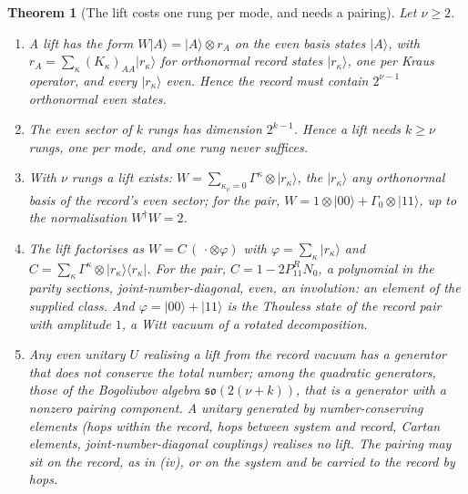 \documentclass[11pt]{article}
\newtheorem{theorem}{Theorem}[section]
\theoremstyle{definition}
\theoremstyle{plain}
\providecommand{\G}{}\renewcommand{\G}{\Gamma}
\providecommand{\bra}{}\renewcommand{\bra}[1]{\langle #1|}
\providecommand{\ket}{}\renewcommand{\ket}[1]{|#1\rangle}
\begin{document}
\begin{theorem}[The lift costs one rung per mode, and needs a pairing]\label{c:descent-lift.lift-costs-one-rung-per-mode}
Let $\nu \geq 2$.
\begin{enumerate}
\item[(i)] A lift has the form $W\ket{A} = \ket{A} \otimes r_{A}$ on the even basis states $\ket{A}$, with $r_{A} = \sum_{\kappa}(K_{\kappa})_{AA}\ket{r_{\kappa}}$ for orthonormal record states $\ket{r_{\kappa}}$, one per Kraus operator, and every $\ket{r_{\kappa}}$ even. Hence the record must contain $2^{\nu-1}$ orthonormal even states.
\item[(ii)] The even sector of $k$ rungs has dimension $2^{k-1}$. Hence a lift needs $k \geq \nu$ rungs, one per mode, and one rung never suffices.
\item[(iii)] With $\nu$ rungs a lift exists: $W = \sum_{\kappa_{\nu} = 0}\G^{\kappa} \otimes \ket{r_{\kappa}}$, the $\ket{r_{\kappa}}$ any orthonormal basis of the record's even sector; for the pair, $W = 1 \otimes \ket{00} + \G_{0} \otimes \ket{11}$, up to the normalisation $W^{\dagger}W = 2$.
\item[(iv)] The lift factorises as $W = C\,(\,\cdot \otimes \varphi)$ with $\varphi = \sum_{\kappa}\ket{r_{\kappa}}$ and $C = \sum_{\kappa}\G^{\kappa} \otimes \ket{r_{\kappa}}\bra{r_{\kappa}}$. For the pair, $C = 1 - 2P^{R}_{11}N_{0}$, a polynomial in the parity sections, joint-number-diagonal, even, an involution: an element of the supplied class. And $\varphi = \ket{00} + \ket{11}$ is the Thouless state of the record pair with amplitude $1$, a Witt vacuum of a rotated decomposition.
\item[(v)] Any even unitary $U$ realising a lift from the record vacuum has a generator that does not conserve the total number; among the quadratic generators, those of the Bogoliubov algebra $\mathfrak{so}(2(\nu + k))$, that is a generator with a nonzero pairing component. A unitary generated by number-conserving elements (hops within the record, hops between system and record, Cartan elements, joint-number-diagonal couplings) realises no lift. The pairing may sit on the record, as in (iv), or on the system and be carried to the record by hops.
\end{enumerate}
\end{theorem}
\end{document}

